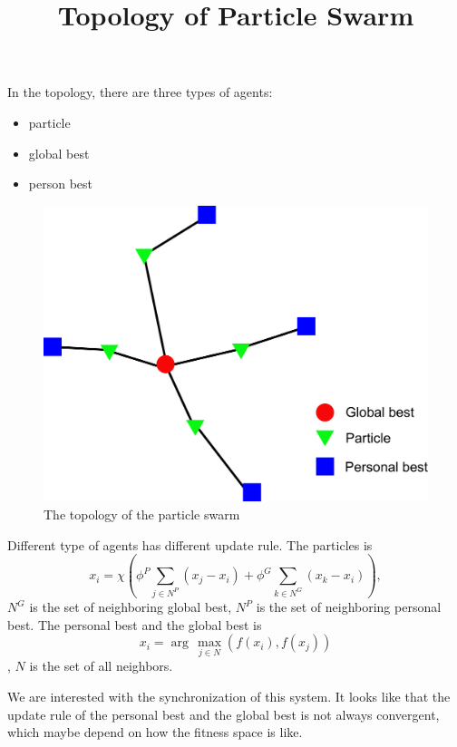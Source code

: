 \documentclass[10pt,a4paper]{article}
\begin{document}
\title{Topology of Particle Swarm}

\date{}

\maketitle

In the topology, there are three types of agents:
\begin{itemize}
\item particle
\item global best
\item person best
\end{itemize}

\begin{figure}[h]
\centering
\includegraphics[width=0.7\linewidth]{topology}
\caption{The topology of the particle swarm}
\label{fig:topology}
\end{figure}

Different type of agents has different update rule.
The particles is 
\begin{equation}
x_{i} = \chi( \phi^{P} \sum_{ j \in N^{P} } ( x_{j} - x_{i} ) + \phi^{G} \sum_{ k \in N^{G} } ( x_{k} - x_{i} ) ),
\end{equation}
$ N^{G} $ is the set of neighboring global best, $ N^{P} $ is the set of neighboring personal best.
The personal best and the global best is
\begin{equation}
x_{i} = \arg \, \max_{ j \in N } ( f( x_{i} ) , f( x_{j} ) )
\end{equation},
$ N $ is the set of all neighbors.

We are interested with the synchronization of this system.
It looks like that the update rule of the personal best and the global best is not always convergent, which maybe depend on how the fitness space is like.
\end{document}
